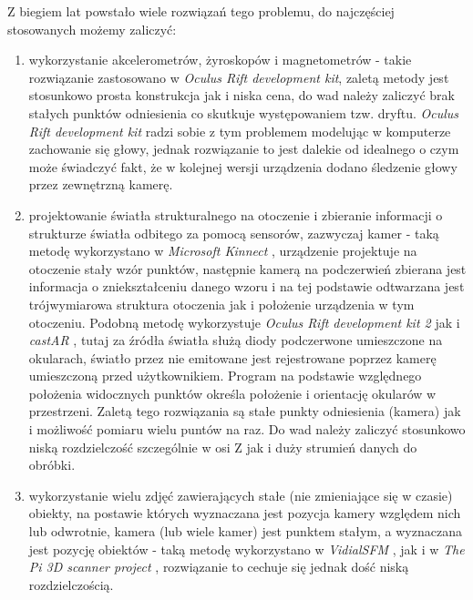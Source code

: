 Z biegiem lat powstało wiele rozwiązań tego problemu, do najczęściej stosowanych możemy zaliczyć:
\begin{enumerate}
 \item 
 wykorzystanie akcelerometrów, żyroskopów i magnetometrów - 
takie rozwiązanie zastosowano w \textit{Oculus Rift development kit}, zaletą metody jest stosunkowo
prosta konstrukcja jak i niska cena,
do wad należy zaliczyć brak stałych punktów odniesienia co skutkuje występowaniem tzw. dryftu.
\textit{Oculus Rift development kit} radzi sobie z tym problemem modelując w komputerze zachowanie się głowy,
jednak rozwiązanie to jest dalekie od idealnego o czym może świadczyć fakt, że w kolejnej wersji 
urządzenia dodano śledzenie głowy przez zewnętrzną kamerę.

\item \label{itm:second_method}
 projektowanie światła strukturalnego na otoczenie i zbieranie informacji o strukturze 
 światła odbitego za pomocą sensorów, zazwyczaj kamer - taką metodę wykorzystano w \textit{Microsoft Kinnect} \cite{bib:MicrosoftKinect},
 urządzenie projektuje na otoczenie stały wzór punktów, następnie kamerą na podczerwień
 zbierana jest informacja o zniekształceniu danego wzoru i na tej podstawie odtwarzana jest 
 trójwymiarowa struktura otoczenia jak i położenie urządzenia w tym otoczeniu.
 Podobną metodę wykorzystuje \textit{Oculus Rift development kit 2} \cite{bib:OculusRiftDK2} jak i 
 \textit{castAR} \cite{bib:castAR}, tutaj za źródła światła służą diody podczerwone umieszczone na okularach,
 światło przez nie emitowane jest rejestrowane poprzez kamerę umieszczoną przed użytkownikiem.
 Program na podstawie względnego położenia widocznych punktów określa położenie i orientację
 okularów w przestrzeni.
 Zaletą tego rozwiązania są stałe punkty odniesienia (kamera) jak i możliwość pomiaru wielu puntów na raz.
 Do wad należy zaliczyć stosunkowo niską rozdzielczość szczególnie w osi Z jak i duży strumień danych do obróbki.

\item
 wykorzystanie wielu zdjęć zawierających stałe (nie zmieniające się w czasie) obiekty, na postawie których wyznaczana jest pozycja kamery względem nich
  lub odwrotnie, kamera (lub wiele kamer) jest punktem stałym, a wyznaczana jest pozycję obiektów -   
 taką metodę wykorzystano w \textit{VidialSFM} \cite{bib:VisualSFM}, jak i w \textit{The Pi 3D scanner project} \cite{bib:pi3dscan}, 
 rozwiązanie to cechuje się jednak dość niską rozdzielczością.
 
\end{enumerate}
 

